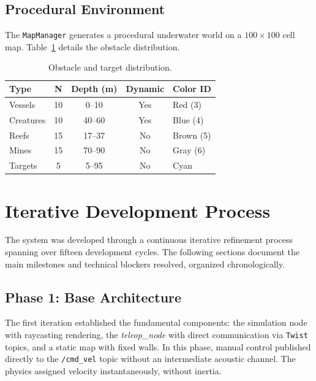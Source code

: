 \documentclass[10pt,twocolumn,letterpaper]{article}
\begin{document}
\subsection{Procedural Environment}

The \texttt{MapManager} generates a procedural underwater world on a $100 \times 100$ cell map. Table~\ref{tab:obstacles} details the obstacle distribution.

\begin{table}[H]
\centering
\caption{Obstacle and target distribution.}
\label{tab:obstacles}
\scriptsize
\begin{tabular}{@{}lcccl@{}}
\toprule
\textbf{Type} & \textbf{N} & \textbf{Depth (m)} & \textbf{Dynamic} & \textbf{Color ID} \\
\midrule
Vessels & 10 & 0--10 & Yes & Red (3) \\
Creatures & 10 & 40--60 & Yes & Blue (4) \\
Reefs & 15 & 17--37 & No & Brown (5) \\
Mines & 15 & 70--90 & No & Gray (6) \\
Targets & 5 & 5--95 & No & Cyan \\
\bottomrule
\end{tabular}
\end{table}

\section{Iterative Development Process}
\label{sec:development}

The system was developed through a continuous iterative refinement process spanning over fifteen development cycles. The following sections document the main milestones and technical blockers resolved, organized chronologically.

\subsection{Phase 1: Base Architecture}

The first iteration established the fundamental components: the simulation node with raycasting rendering, the \textit{teleop\_node} with direct communication via \texttt{Twist} topics, and a static map with fixed walls. In this phase, manual control published directly to the \texttt{/cmd\_vel} topic without an intermediate acoustic channel. The physics assigned velocity instantaneously, without inertia.
\end{document}
